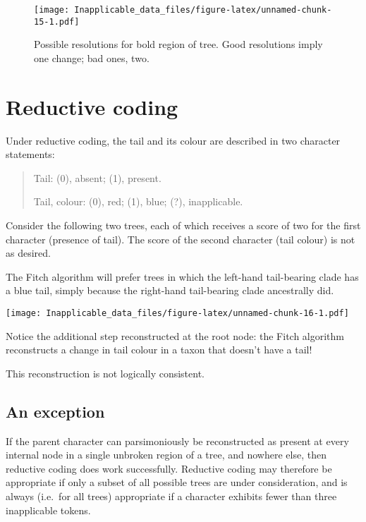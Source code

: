\documentclass[]{book}
\theoremstyle{definition}
\theoremstyle{definition}
\theoremstyle{definition}
\theoremstyle{remark}
\begin{document}
\begin{figure}
\centering
\texttt{[image: Inapplicable\_data\_files/figure-latex/unnamed-chunk-15-1.pdf]}
\caption{\label{fig:unnamed-chunk-15}Possible resolutions for bold region of
tree. Good resolutions imply one change; bad ones, two.}
\end{figure}

\hypertarget{reductive-coding}{%
\section{Reductive coding}\label{reductive-coding}}

Under reductive coding, the tail and its colour are described in two
character statements:

\begin{quote}
Tail: (0), absent; (1), present.

Tail, colour: (0), red; (1), blue; (?), inapplicable.
\end{quote}

Consider the following two trees, each of which receives a score of two
for the first character (presence of tail). The score of the second
character (tail colour) is not as desired.

The Fitch algorithm will prefer trees in which the left-hand
tail-bearing clade has a blue tail, simply because the right-hand
tail-bearing clade ancestrally did.

\texttt{[image: Inapplicable\_data\_files/figure-latex/unnamed-chunk-16-1.pdf]}

Notice the additional step reconstructed at the root node: the Fitch
algorithm reconstructs a change in tail colour in a taxon that doesn't
have a tail!

This reconstruction is not logically consistent.

\hypertarget{an-exception}{%
\subsection{An exception}\label{an-exception}}

If the parent character can parsimoniously be reconstructed as present
at every internal node in a single unbroken region of a tree, and
nowhere else, then reductive coding does work successfully. Reductive
coding may therefore be appropriate if only a subset of all possible
trees are under consideration, and is always (i.e.~for all trees)
appropriate if a character exhibits fewer than three inapplicable
tokens.
\end{document}
